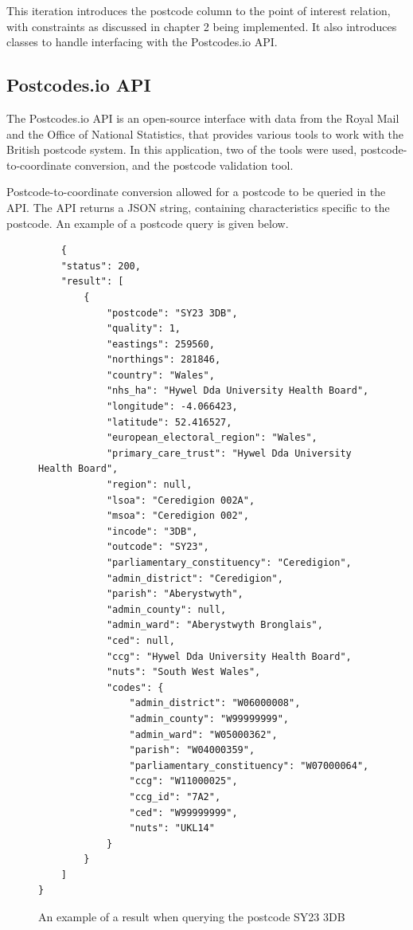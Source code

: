 This iteration introduces the postcode column to the point of interest relation, with constraints as discussed in chapter 2 being implemented. It also introduces classes to handle interfacing with the Postcodes.io API.

\subsection{Postcodes.io API}

The Postcodes.io API is an open-source interface with data from the Royal Mail and the Office of National Statistics, that provides various tools to work with the British postcode system. In this application, two of the tools were used, postcode-to-coordinate conversion, and the postcode validation tool.

Postcode-to-coordinate conversion allowed for a postcode to be queried in the API. The API returns a JSON string, containing characteristics specific to the postcode. An example of a postcode query is given below.

\begin{figure}[H]
	\begin{verbatim}
	{
    "status": 200,
    "result": [
        {
            "postcode": "SY23 3DB",
            "quality": 1,
            "eastings": 259560,
            "northings": 281846,
            "country": "Wales",
            "nhs_ha": "Hywel Dda University Health Board",
            "longitude": -4.066423,
            "latitude": 52.416527,
            "european_electoral_region": "Wales",
            "primary_care_trust": "Hywel Dda University Health Board",
            "region": null,
            "lsoa": "Ceredigion 002A",
            "msoa": "Ceredigion 002",
            "incode": "3DB",
            "outcode": "SY23",
            "parliamentary_constituency": "Ceredigion",
            "admin_district": "Ceredigion",
            "parish": "Aberystwyth",
            "admin_county": null,
            "admin_ward": "Aberystwyth Bronglais",
            "ced": null,
            "ccg": "Hywel Dda University Health Board",
            "nuts": "South West Wales",
            "codes": {
                "admin_district": "W06000008",
                "admin_county": "W99999999",
                "admin_ward": "W05000362",
                "parish": "W04000359",
                "parliamentary_constituency": "W07000064",
                "ccg": "W11000025",
                "ccg_id": "7A2",
                "ced": "W99999999",
                "nuts": "UKL14"
            }
        }
    ]
}
	\end{verbatim}
	\caption{An example of a result when querying the postcode SY23 3DB}
\end{figure}
	
